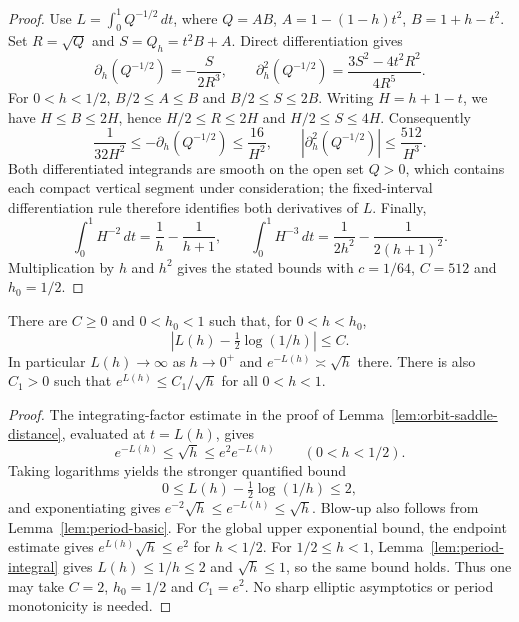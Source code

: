 \begin{proof}
\leanok
Use $L=\int_0^1Q^{-1/2}\,dt$, where
$Q=AB$, $A=1-(1-h)t^2$, $B=1+h-t^2$.
Set $R=\sqrt Q$ and $S=Q_h=t^2B+A$. Direct differentiation gives
\[
 \partial_h(Q^{-1/2})=-\frac{S}{2R^3},\qquad
 \partial_h^2(Q^{-1/2})=\frac{3S^2-4t^2R^2}{4R^5}.
\]
For $0<h<1/2$, $B/2\le A\le B$ and $B/2\le S\le2B$.
Writing $H=h+1-t$, we have $H\le B\le2H$, hence
$H/2\le R\le2H$ and $H/2\le S\le4H$. Consequently
\[
 \frac{1}{32H^2}\le-\partial_h(Q^{-1/2})\le\frac{16}{H^2},
 \qquad |\partial_h^2(Q^{-1/2})|\le\frac{512}{H^3}.
\]
Both differentiated integrands are smooth on the open set $Q>0$,
which contains each compact vertical segment under consideration;
the fixed-interval differentiation rule therefore identifies both derivatives
of $L$. Finally,
\[
 \int_0^1H^{-2}\,dt=\frac1h-\frac1{h+1},\qquad
 \int_0^1H^{-3}\,dt=\frac1{2h^2}-\frac1{2(h+1)^2}.
\]
Multiplication by $h$ and $h^2$ gives the stated bounds with
$c=1/64$, $C=512$ and $h_0=1/2$.
\end{proof}

\begin{lemma}
\label{lem:period-coarse}
\leanok
There are $C\ge0$ and $0<h_0<1$ such that, for $0<h<h_0$,
\[
  \left|L(h)-\tfrac12\log(1/h)\right|\le C .
\]
In particular $L(h)\to\infty$ as $h\to0^+$ and
$e^{-L(h)}\asymp\sqrt h$ there. There is also $C_1>0$ such that
$e^{L(h)}\le C_1/\sqrt h$ for all $0<h<1$.
\end{lemma}

\begin{proof}
\leanok
The integrating-factor estimate in the proof of
Lemma~\ref{lem:orbit-saddle-distance}, evaluated at $t=L(h)$, gives
\[
  e^{-L(h)}\le\sqrt h\le e^2 e^{-L(h)}\qquad(0<h<1/2).
\]
Taking logarithms yields the stronger quantified bound
\[
  0\le L(h)-\tfrac12\log(1/h)\le2,
\]
and exponentiating gives
$e^{-2}\sqrt h\le e^{-L(h)}\le\sqrt h$.
Blow-up also follows from Lemma~\ref{lem:period-basic}.
For the global upper exponential bound, the endpoint estimate gives
$e^{L(h)}\sqrt h\le e^2$ for $h<1/2$. For $1/2\le h<1$,
Lemma~\ref{lem:period-integral} gives $L(h)\le1/h\le2$ and
$\sqrt h\le1$, so the same bound holds. Thus one may take
$C=2$, $h_0=1/2$ and $C_1=e^2$.
No sharp elliptic asymptotics or period monotonicity is needed.
\end{proof}

